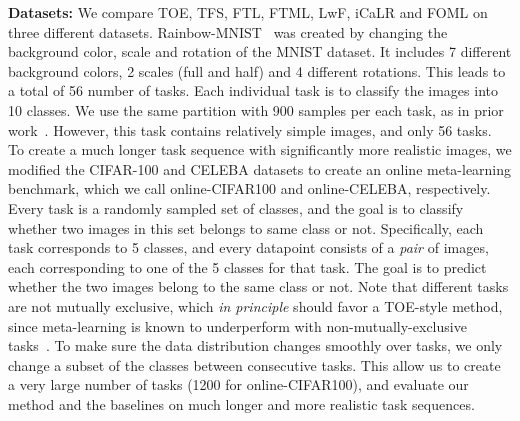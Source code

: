 \noindent \textbf{Datasets:} We compare TOE, TFS, FTL, FTML, LwF, iCaLR and FOML on three different datasets. Rainbow-MNIST~\citep{finn19a} was created by changing the background color, scale and rotation of the MNIST dataset. It includes 7 different background colors, 2 scales (full and half) and 4 different rotations. This leads to a total of 56 number of tasks. Each individual task is to classify the images into 10 classes. We use the same partition with 900 samples per each task, as in prior work~\citep{finn19a}. However, this task contains relatively simple images, and only 56 tasks. To create a much longer task sequence with significantly more realistic images, we modified the CIFAR-100 and CELEBA datasets to create an online meta-learning benchmark, which we call online-CIFAR100 and online-CELEBA, respectively. Every task is a randomly sampled set of classes, and the goal is to classify whether two images in this set belongs to same class or not. Specifically, each task corresponds to 5 classes, and every datapoint consists of a \emph{pair} of images, each corresponding to one of the 5 classes for that task. The goal is to predict whether the two images belong to the same class or not. Note that different tasks are not mutually exclusive, which \emph{in principle} should favor a TOE-style method, since meta-learning is known to underperform with non-mutually-exclusive tasks~\citep{yin2019meta}. To make sure the data distribution changes smoothly over tasks, we only change a subset of the classes between consecutive tasks. This allow us to create a very large number of tasks (1200 for online-CIFAR100), and evaluate our method and the baselines on much longer and more realistic task sequences.

